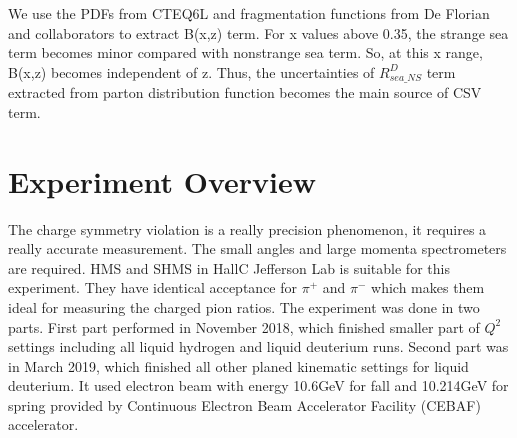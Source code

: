 \documentclass[12pt]{article}
\begin{document}
 We use the PDFs from CTEQ6L and fragmentation functions from De Florian and collaborators to extract B(x,z) term\cite{PhysRevLett.88.091802}. For x values above 0.35, the strange sea term becomes minor compared with nonstrange sea term. So, at this x range, B(x,z) becomes independent of z. Thus, the uncertainties of $R^D_{sea\_NS}$ term extracted from parton distribution function becomes the main source of CSV term. 
 
 \section{Experiment Overview}
  
The charge symmetry violation is a really precision phenomenon, it requires a really accurate measurement. The small angles and large momenta spectrometers are required. HMS and SHMS in HallC Jefferson Lab is suitable for this experiment. They have identical acceptance for $\pi^+$ and $\pi^-$ which makes them ideal for measuring the charged pion ratios. The experiment was done in two parts. First part performed in November 2018, which finished smaller part of $Q^2$ settings including all liquid hydrogen and liquid deuterium runs. Second part was in March 2019, which finished all other planed kinematic settings for liquid deuterium. It used electron beam with energy 10.6GeV for fall and 10.214GeV for spring provided by Continuous Electron Beam Accelerator Facility (CEBAF) accelerator.
\end{document}

